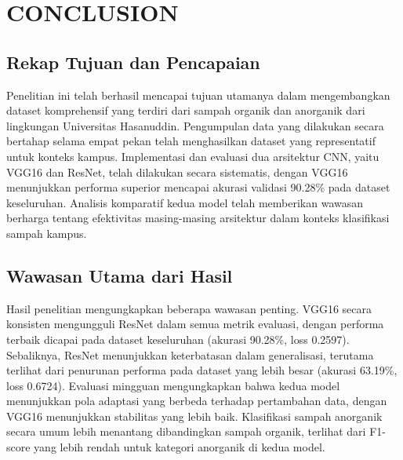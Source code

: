 \documentclass[12pt,a4paper]{article}
\begin{document}
\section{CONCLUSION}
\begin{adjustwidth}{3em}{0pt}
\subsection{Rekap Tujuan dan Pencapaian}
\hspace{0.5cm} Penelitian ini telah berhasil mencapai tujuan utamanya dalam mengembangkan dataset komprehensif yang terdiri dari sampah organik dan anorganik dari lingkungan Universitas Hasanuddin. Pengumpulan data yang dilakukan secara bertahap selama empat pekan telah menghasilkan dataset yang representatif untuk konteks kampus. Implementasi dan evaluasi dua arsitektur CNN, yaitu VGG16 dan ResNet, telah dilakukan secara sistematis, dengan VGG16 menunjukkan performa superior mencapai akurasi validasi 90.28\% pada dataset keseluruhan. Analisis komparatif kedua model telah memberikan wawasan berharga tentang efektivitas masing-masing arsitektur dalam konteks klasifikasi sampah kampus.

\subsection{Wawasan Utama dari Hasil}
\hspace{0.5cm} Hasil penelitian mengungkapkan beberapa wawasan penting. VGG16 secara konsisten mengungguli ResNet dalam semua metrik evaluasi, dengan performa terbaik dicapai pada dataset keseluruhan (akurasi 90.28\%, loss 0.2597). Sebaliknya, ResNet menunjukkan keterbatasan dalam generalisasi, terutama terlihat dari penurunan performa pada dataset yang lebih besar (akurasi 63.19\%, loss 0.6724). Evaluasi mingguan mengungkapkan bahwa kedua model menunjukkan pola adaptasi yang berbeda terhadap pertambahan data, dengan VGG16 menunjukkan stabilitas yang lebih baik. Klasifikasi sampah anorganik secara umum lebih menantang dibandingkan sampah organik, terlihat dari F1-score yang lebih rendah untuk kategori anorganik di kedua model.


\end{adjustwidth}
\end{document}
